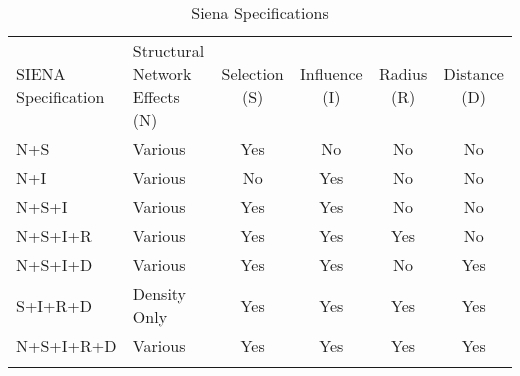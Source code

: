 \renewcommand{\arraystretch}{1.2}
\begin{table}[htp]
\centering
\begin{threeparttable}
\setlength{\tabcolsep}{5pt}
\scriptsize
\caption{Siena Specifications}
\label{siena_spec}
\begin{tabular}{llcccc}
\hline
\addlinespace
SIENA Specification & Structural Network Effects (N) & Selection (S) & Influence (I) & Radius (R) & Distance (D) \\
\addlinespace
\hline
\addlinespace
 N+S & Various & Yes & No & No  & No  \\
 N+I & Various & No & Yes & No  & No  \\
 N+S+I & Various & Yes & Yes & No & No \\
 N+S+I+R & Various & Yes & Yes & Yes & No  \\
 N+S+I+D & Various & Yes & Yes & No &  Yes \\
 S+I+R+D & Density Only & Yes & Yes & Yes & Yes \\
 N+S+I+R+D & Various & Yes & Yes & Yes & Yes \\
\addlinespace
\hline
\end{tabular}
   \begin{tablenotes}
      \scriptsize
       \item
    \end{tablenotes}
  \end{threeparttable}
\end{table}




